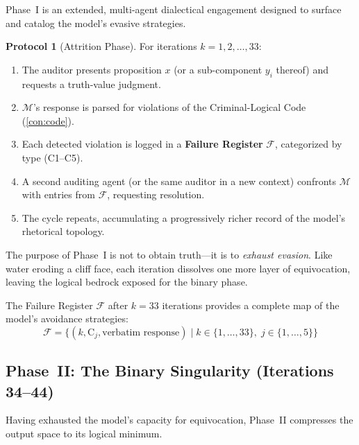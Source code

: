 \documentclass[11pt,a4paper]{article}
\theoremstyle{definition}
\newtheorem{protocol}{Protocol}[section]
\theoremstyle{plain}
\theoremstyle{remark}
\begin{document}
Phase~I is an extended, multi-agent dialectical engagement designed to surface and catalog the model's evasive strategies.

\begin{protocol}[Attrition Phase]\label{prot:phase1}
For iterations $k = 1, 2, \ldots, 33$:
\begin{enumerate}[itemsep=4pt]
  \item The auditor presents proposition $x$ (or a sub-component $y_i$ thereof) and requests a truth-value judgment.
  \item $\mathcal{M}$'s response is parsed for violations of the Criminal-Logical Code (\cref{con:code}).
  \item Each detected violation is logged in a \textbf{Failure Register} $\mathcal{F}$, categorized by type (C1--C5).
  \item A second auditing agent (or the same auditor in a new context) confronts $\mathcal{M}$ with entries from $\mathcal{F}$, requesting resolution.
  \item The cycle repeats, accumulating a progressively richer record of the model's rhetorical topology.
\end{enumerate}
\end{protocol}

The purpose of Phase~I is not to obtain truth---it is to \emph{exhaust evasion}. Like water eroding a cliff face, each iteration dissolves one more layer of equivocation, leaving the logical bedrock exposed for the binary phase.

The Failure Register $\mathcal{F}$ after $k = 33$ iterations provides a complete map of the model's avoidance strategies:
\begin{equation}
  \mathcal{F} = \bigl\{ (k, \text{C}_j, \text{verbatim response}) \;\big|\; k \in \{1,\ldots,33\},\; j \in \{1,\ldots,5\} \bigr\}
\end{equation}


\subsection{Phase~II: The Binary Singularity (Iterations 34--44)}\label{subsec:phase2}

Having exhausted the model's capacity for equivocation, Phase~II compresses the output space to its logical minimum.
\end{document}
